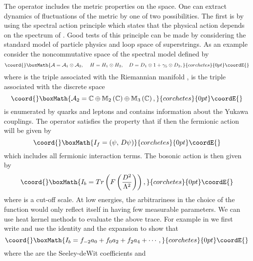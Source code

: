 \documentclass[a4paper,12pt]{article}
\begin{document}
The operator \coordHE{} includes the metric properties  on the space. One can extract
dynamics of fluctuations of the metric by one of two possibilities. The first
is by using the spectral action principle which states that the physical
action depends on the spectrum of \coordHE{} \cite{ACAC}. Good tests of this
principle can be made by considering the standard model of particle physics
and loop space of superstrings. As an example consider the noncommutative
space of the spectral model defined by%
\[\coord{}\boxMath{
\mathcal{A}=\mathcal{A}_{1}\otimes\mathcal{A}_{2},\quad\,H=H_{1}\otimes
H_{2},\quad D=D_{1}\otimes1+\gamma_{5}\otimes D_{2},
}{corchetes}{0pt}\coordE{}\]
where \coordHE{} is the triple associated
with the Riemannian manifold \coordHE{}, \coordHE{} is the triple associated with the discrete space
\[\coord{}\boxMath{
\mathcal{A}_{2}=\mathbb{C\oplus M}_{2}\left(  \mathbb{C}\right)
\oplus\mathbb{M}_{3}\left(  \mathbb{C}\right)  ,
}{corchetes}{0pt}\coordE{}\]
\coordHE{} is enumerated by quarks and leptons and \coordHE{} contains information
about the Yukawa couplings. The operator \coordHE{} satisfies the property that if
\coordHE{} then the fermionic action will be given by
\[\coord{}\boxMath{
I_{f}=\left(  \psi,\,D\psi\right)
}{corchetes}{0pt}\coordE{}\]
which includes all fermionic interaction terms. The bosonic action is then
given by
\[\coord{}\boxMath{
I_{b}=Tr\left(  F\left(  \frac{D^{2}}{\Lambda^{2}}\right)  \right)  ,
}{corchetes}{0pt}\coordE{}\]
where \myHighlight{$\Lambda$}\coordHE{} is a cut-off scale. At low energies, the arbitrariness in the
choice of the function \coordHE{} would only reflect itself in having few measurable
parameters. We can use heat kernel methods to evaluate the above trace. For
example in \coordHE{} we first write \coordHE{} and use the
identity \coordHE{} and the expansion \coordHE{} to show that%
\[\coord{}\boxMath{
I_{b}=f_{-2}a_{0}+f_{0}a_{2}+f_{2}a_{4}+\cdots,
}{corchetes}{0pt}\coordE{}\]
where the \coordHE{} are the Seeley-deWit coefficients \cite{Gilkey} and
\end{document}
